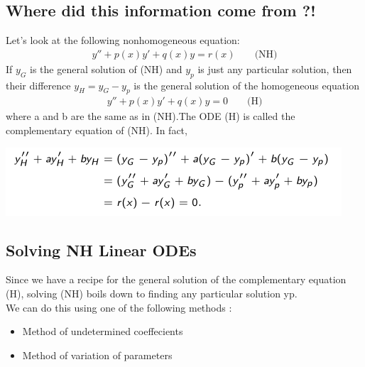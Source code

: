 \documentclass[11pt]{article}
\theoremstyle{definition}
\begin{document}
\subsection{Where did this information come from ?! }
Let's look at the following nonhomogeneous equation:
\begin{align*}
    y''+p(x)y'+q(x)y=r(x) && \text{ (NH)}
\end{align*}
If $y_G$ is the general solution of (NH) and $y_p$ is just any particular solution, then their difference $y_H = y_G - y_p$ is the general solution of the homogeneous equation
\begin{align*}
    y''+p(x)y'+q(x)y=0 && \text{ (H)}
\end{align*}
where a and b are the same as in (NH).The ODE (H) is called the complementary equation of (NH).
In fact,
\begin{center}
    \includegraphics[]{images/eqn.png}
\end{center}
\subsection{Solving NH Linear ODEs}
Since we have a recipe for the general solution of the complementary equation (H), solving (NH) boils down to finding any particular solution yp.\\
We can do this using one of the following methods :
\begin{itemize}
    \item Method of undetermined coeffecients
    \item Method of variation of parameters
\end{itemize}
\end{document}

